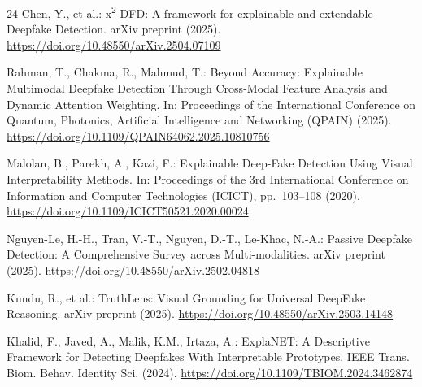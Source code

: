 \documentclass[pdflatex,sn-mathphys-num]{sn-jnl}
\begin{document}
\begin{thebibliography}{24}
Chen, Y., et al.: x\textsuperscript{2}-DFD: A framework for explainable and extendable Deepfake Detection. arXiv preprint (2025). \url{https://doi.org/10.48550/arXiv.2504.07109}

Rahman, T., Chakma, R., Mahmud, T.: Beyond Accuracy: Explainable Multimodal Deepfake Detection Through Cross-Modal Feature Analysis and Dynamic Attention Weighting. In: Proceedings of the International Conference on Quantum, Photonics, Artificial Intelligence and Networking (QPAIN) (2025). \url{https://doi.org/10.1109/QPAIN64062.2025.10810756}

Malolan, B., Parekh, A., Kazi, F.: Explainable Deep-Fake Detection Using Visual Interpretability Methods. In: Proceedings of the 3rd International Conference on Information and Computer Technologies (ICICT), pp.~103--108 (2020). \url{https://doi.org/10.1109/ICICT50521.2020.00024}

Nguyen-Le, H.-H., Tran, V.-T., Nguyen, D.-T., Le-Khac, N.-A.: Passive Deepfake Detection: A Comprehensive Survey across Multi-modalities. arXiv preprint (2025). \url{https://doi.org/10.48550/arXiv.2502.04818}

Kundu, R., et al.: TruthLens: Visual Grounding for Universal DeepFake Reasoning. arXiv preprint (2025). \url{https://doi.org/10.48550/arXiv.2503.14148}

Khalid, F., Javed, A., Malik, K.M., Irtaza, A.: ExplaNET: A Descriptive Framework for Detecting Deepfakes With Interpretable Prototypes. IEEE Trans. Biom. Behav. Identity Sci. (2024). \url{https://doi.org/10.1109/TBIOM.2024.3462874}

\end{thebibliography}
\end{document}
